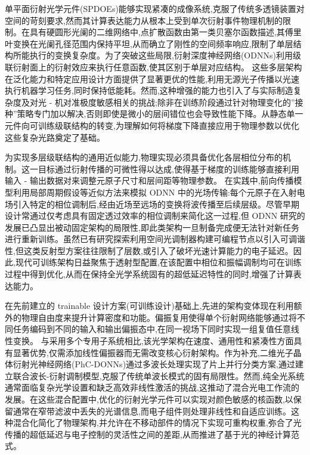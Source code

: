 \documentclass[11pt]{article}
\begin{document}
单平面衍射光学元件(SPDOEs)能够实现紧凑的成像系统,克服了传统多透镜装置对空间的苛刻要求,然而其计算表达能力从根本上受到单次衍射事件物理机制的限制。在具有硬圆形光阑的二维网络中,点扩散函数由第一类贝塞尔函数描述,其傅里叶变换在光阑孔径范围内保持平坦,从而确立了刚性的空间频率响应,限制了单层结构所能执行的变换复杂度。为了突破这些局限,衍射深度神经网络(ODNNs)利用级联衍射面上的衍射效应来执行任意函数,使其区别于单层对应结构。\citep{doi_10_1186_s43593_025_00113_w_ca9e8e1e} 这些多层架构在泛化能力和特定应用设计方面提供了显著更优的性能,利用无源光子传播以光速执行机器学习任务,同时保持低能耗。然而,这种增强的能力也引入了与实际制造复杂度及对光 - 机对准极度敏感相关的挑战;除非在训练阶段通过针对物理变化的''接种''策略专门加以解决,否则即使是微小的层间错位也会导致性能下降。从静态单一元件向可训练级联结构的转变,为理解如何将梯度下降直接应用于物理参数以优化这些复杂光路奠定了基础。\citep{s2_7caf7c29ac69aa12038f926409fb469f65ebeb2a_e9ce584d} \citep{doi_10_1364_oe_579297_3ffb4db0} \citep{doi_10_1364_oe_446890_26d35f03} \citep{doi_10_1515_nanoph_2020_0291_c4a9f42d} \citep{doi_10_1364_optica_576204_30060082}

为实现多层级联结构的通用近似能力,物理实现必须具备优化各层相位分布的机制。这一目标通过衍射传播的可微性得以达成,使得基于梯度的训练能够直接利用输入 - 输出数据对来调整元原子尺寸和层间距等物理参数。\citep{doi_10_1117_12_2661856_e8f727e8} \citep{doi_10_1002_mop_70313_0297d592} 在实践中,前向传播模型利用局部周期假设等近似方法来模拟 ODNN 中的光场传输:每个元原子在入射电场引入特定的相位调制后,经由近场至远场的变换将波传播至后续层级。尽管早期设计常通过仅考虑具有固定透过效率的相位调制来简化这一过程,但 ODNN 研究的发展已凸显出被动固定架构的局限性,即此类架构一旦制备完成便无法针对新任务进行重新训练。虽然已有研究探索利用空间光调制器构建可编程节点以引入可调谐性,但这类反射型方案往往限制了层数,或引入了破坏光速计算能力的电子延迟。因此,现代可训练架构日益聚焦于透射型配置,在该配置中相位和振幅调制均可在训练过程中得到优化,从而在保持全光学系统固有的超低延迟特性的同时,增强了计算表达能力。\citep{doi_10_1038_s41598_022_19973_0_e156e6e2} \citep{doi_10_1038_s41928_022_00719_9_a2169947}

在先前建立的 trainable 设计方案(可训练设计)基础上,先进的架构变体现在利用额外的物理自由度来提升计算密度和功能。偏振复用使得单个衍射网络能够通过将不同任务编码到不同的输入和输出偏振态中,在同一视场下同时实现一组复值任意线性变换。\citep{doi_10_1038_s41377_022_00849_x_e31226af} 与采用多个专用子系统相比,该光学架构在速度、通用性和紧凑性方面具有显著优势,仅需添加线性偏振器而无需改变核心衍射架构。作为补充,二维光子晶体衍射光神经网络(PhC-DONNs)通过多波长处理实现了片上并行分类方案,通过建立联合波长-衍射调制模型,克服了传统单波长模式的固有局限性。然而,纯全光系统通常面临复杂光学设置和缺乏高效非线性激活的挑战,这推动了混合光电工作流的发展。在这些混合配置中,优化的衍射光学元件可以实现对颜色敏感的核函数,以保留通常在窄带滤波中丢失的光谱信息,而电子组件则处理非线性和自适应训练。这种混合化简化了物理架构,并允许在不移动部件的情况下实现可重构权重,弥合了光传播的超低延迟与电子控制的灵活性之间的差距,从而推进了基于光的神经计算范式。\citep{doi_10_1038_s41377_022_00849_x_e31226af} \citep{doi_10_1515_nanoph_2025_0168_86a0f7aa} \citep{doi_10_1038_s41598_018_30619_y_5f5bfb09} \citep{doi_10_1364_oe_462370_1269b480}
\end{document}
